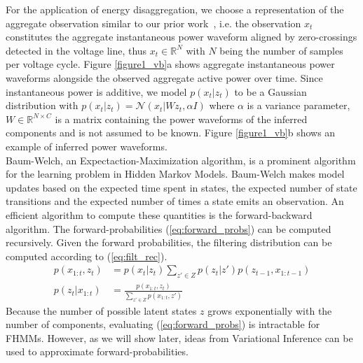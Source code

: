 For the application of energy disaggregation, we choose a representation of the aggregate observation similar to our prior work~\cite{lange2016bolt}, i.e. the observation $x_t$ constitutes the aggregate instantaneous power waveform aligned by zero-crossings detected in the voltage line, thus $x_t \in \mathbb{R}^N$ with $N$ being the number of samples per voltage cycle. Figure \ref{figure1_vb}a shows aggregate instantaneous power waveforms alongside the observed aggregate active power over time. Since instantaneous power is additive, we model $p(x_t|z_t)$ to be a Gaussian distribution with $p(x_t|z_t) = \mathcal{N}(x_t | Wz_t, \alpha I)$ where $\alpha$ is a variance parameter, $W \in \mathbb{R}^{N \times C}$ is a matrix containing the power waveforms of the inferred components and is not assumed to be known. Figure \ref{figure1_vb}b shows an example of inferred power waveforms.\\
Baum-Welch, an Expectaction-Maximization algorithm, is a prominent algorithm for the learning problem in Hidden Markov Models. Baum-Welch makes model updates based on the expected time spent in states, the expected number of state transitions and the expected number of times a state emits an observation. An efficient algorithm to compute these quantities is the forward-backward algorithm. The forward-probabilities (\ref{eq:forward_probs}) can be computed recursively. Given the forward probabilities, the filtering distribution can be computed according to (\ref{eq:filt_rec}).
\begin{align}
p(x_{1:t},z_t) &= p(x_t|z_t) \sum_{z' \in Z} p(z_t|z') p(z_{t-1}, x_{1:t-1}) \label{eq:forward_probs}\\
p(z_t|x_{1:t}) &= \frac{p(x_{1:t},z_t)}{\sum_{z' \in Z} p(x_{1:t},z')} \label{eq:filt_rec}
\end{align}
Because the number of possible latent states $z$ grows exponentially with the number of components, evaluating (\ref{eq:forward_probs}) is intractable for FHMMs. However, as we will show later, ideas from Variational Inference can be used to approximate forward-probabilities.\\

